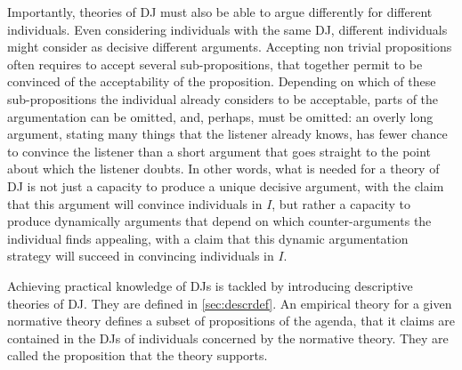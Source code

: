 \documentclass[version=last, pagesize, twoside=off, bibliography=totoc, DIV=calc, fontsize=12pt, a4paper, french, english]{scrartcl}
\begin{document}
Importantly, theories of \ac{DJ} must also be able to argue differently for different individuals. Even considering individuals with the same \ac{DJ}, different individuals might consider as decisive different arguments. Accepting non trivial propositions often requires to accept several sub-propositions, that together permit to be convinced of the acceptability of the proposition. Depending on which of these sub-propositions the individual already considers to be acceptable, parts of the argumentation can be omitted, and, perhaps, must be omitted: an overly long argument, stating many things that the listener already knows, has fewer chance to convince the listener than a short argument that goes straight to the point about which the listener doubts. 
In other words, what is needed for a theory of \ac{DJ} is not just a capacity to produce a unique decisive argument, with the claim that this argument will convince individuals in $I$, but rather a capacity to produce dynamically arguments that depend on which counter-arguments the individual finds appealing, with a claim that this dynamic argumentation strategy will succeed in convincing individuals in $I$. 

Achieving practical knowledge of \acp{DJ} is tackled by introducing descriptive theories of \ac{DJ}. They are defined in \cref{sec:descrdef}. An empirical theory for a given normative theory defines a subset of propositions of the agenda, that it claims are contained in the \acp{DJ} of individuals concerned by the normative theory. They are called the proposition that the theory supports.  
\end{document}
